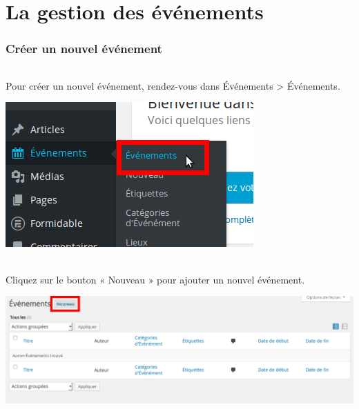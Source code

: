 \documentclass[10pt,a4paper]{article}
\begin{document}
\part{La gestion des événements}
\newpage

\section{Créer un nouvel événement}
\paragraph{}Pour créer un nouvel événement, rendez-vous dans Événements > Événements.
\begin{center}
\includegraphics[scale=0.3]{img/0196.png}
\end{center}
\paragraph{}Cliquez sur le bouton « Nouveau » pour ajouter un nouvel événement.
\begin{center}
\includegraphics[scale=0.3]{img/0197.png}
\end{center}
\newpage
\end{document}
